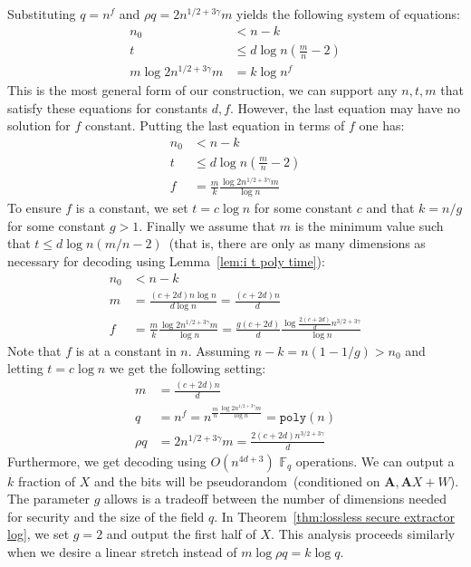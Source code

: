 \documentclass[11pt]{article}
\newcommand{\thref}[1]{\mbox{Theorem~\ref{#1}}}
\newcommand{\lemref}[1]{\mbox{Lemma~\ref{#1}}}
\newcommand{\vect}[1]{\ensuremath{\textbf{#1}}}
\newcommand{\Fq}{\ensuremath{\mathbb{F}_q}}
\newcommand{\poly}{\ensuremath{\mathtt{poly}}\xspace}
\newcommand{\authnote}[2]{{\textcolor{red}{\textsf{#1 notes: }\textcolor{blue}{ #2}}\marginpar{\textcolor{red}{\textbf{!!!!!}}}}}
\newcommand{\authnote}[2]{}
\newcommand{\xnote}[1]{{\authnote{Xianrui}{#1}}}
\newcommand{\vA}{\vect{A}}
\begin{document}
Substituting $q = n^f$ and $\rho q = 2n^{1/2+3\gamma}m$ yields the following system of equations:
\begin{align*}
n_0&< n - k\\
t&\leq d\log n\left(\frac{m}{n}-2\right)\\
m \log 2n^{1/2+3\gamma}m &= k \log n^f
\end{align*}
This is the most general form of our construction, we can support any $n, t, m$ that satisfy these equations for constants $d, f$.  However, the last equation may have no solution for $f$ constant.  Putting the last equation in terms of $f$ one has:
\begin{align*}
n_0&< n -k \\
t&\leq d\log n\left(\frac{ m }{n} -2\right)\\
f &= \frac{m}{k}\frac{\log 2n^{1/2+3\gamma} m}{\log n}
\end{align*}
To ensure $f$ is a constant, we set $t = c \log n$ for some constant $c$ and that $k = n /g$ for some constant $g> 1$.  Finally we assume that $m$ is the minimum value such that $t \leq d \log n(m/n-2)$~(that is, there are only as many dimensions as necessary for decoding using \lemref{lem:i t poly time}):
\begin{align*}
n_0&< n -k \\
m &= \frac{(c+2d)n \log n}{d \log n} = \frac{(c+2d)n}{d}\\
f &= \frac{m}{k}\frac{\log 2n^{1/2+3\gamma}m}{\log n} = \frac{g(c+2d)}{d}\frac{\log \frac{2(c+2d)}{d} n^{3/2+3\gamma}}{\log n}
\end{align*}
Note that $f$ is at a constant in $n$.
Assuming $n-k = n(1-1/g) > n_0$ and letting $t= c\log n$ we get the following setting:
\begin{align*}
m &= \frac{(c+2d)n}{d}\\
q & = n^f = n^{\frac{m}{n}\frac{\log 2n^{1/2+3\gamma}m}{\log n}} = \poly(n)\\
\rho q &= 2n^{1/2+3\gamma}m = \frac{2(c+2d)n^{3/2+3\gamma}}{d}
\end{align*}
Furthermore, we get decoding using $O(n^{4d+3})$ $\Fq$ operations.  We can output a $k$ fraction of $X$ and the bits will be pseudorandom~(conditioned on $\vA, \vA X+W$).  The parameter $g$ allows is a tradeoff between the number of dimensions needed for security and the size of the field $q$.  In \thref{thm:lossless secure extractor log}, we set $g=2$ and output the first half of $X$.  This analysis proceeds similarly when we desire a linear stretch instead of $m\log \rho q = k\log q$.  %
\end{document}
